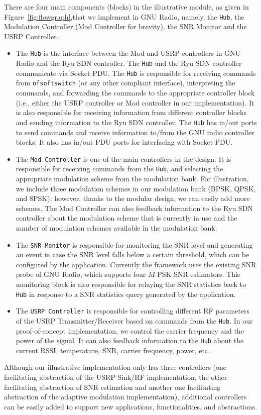 There are four main components (blocks) in the illustrative \crossflow module, as given in Figure~\ref{fig:flowgraph},that we implement in GNU Radio, namely, the \texttt{\crossflow Hub}, the Modulation Controller (Mod Controller for brevity), the SNR Monitor and the USRP Controller.
\begin{itemize}
\item The \texttt{\crossflow Hub} is the interface between the Mod and USRP controllers in GNU Radio and the Ryu SDN controller. The \texttt{\crossflow Hub} and the Ryu SDN controller communicate via Socket PDU. The \texttt{\crossflow Hub} is responsible for receiving commands from \texttt{ofsoftswitch} (or any other compliant interface), interpreting the commands, and forwarding the commands to the appropriate controller block (i.e., either the USRP controller or Mod controller in our implementation). It is also responsible for receiving information from different controller blocks and sending information to the Ryu SDN controller. The \texttt{\crossflow Hub} has in/out ports to send commands and receive information to/from the GNU radio controller blocks. It also has in/out PDU ports for interfacing with Socket PDU.
\item The \texttt{Mod Controller} is one of the main controllers in the design. It is responsible for receiving commands from the \texttt{\crossflow Hub}, and selecting the appropriate modulation scheme from the modulation bank. For illustration, we include three modulation schemes in our modulation bank (BPSK, QPSK, and 8PSK); however, thanks to the modular design, we can easily add more schemes. The Mod Controller can also feedback information to the Ryu SDN controller about the modulation scheme that is currently in use and the number of modulation schemes available in the modulation bank.
\item The \texttt{SNR Monitor} is responsible for monitoring the SNR level and generating an event in case the SNR level falls below a certain threshold, which can be configured by the application. Currently the framework uses the existing SNR probe of GNU Radio, which supports four $M$-PSK SNR estimators. This monitoring block is also responsible for relaying the SNR statistics back to \texttt{\crossflow Hub} in response to a SNR statistics query generated by the application.
\item The \texttt{USRP Controller} is responsible for controlling different RF parameters of the USRP Transmitter/Receiver based on commands from the \texttt{\crossflow Hub}. In our proof-of-concept implementation, we control the carrier frequency and the power of the signal. It can also feedback information to the \texttt{\crossflow Hub} about the current RSSI, temperature, SNR, carrier frequency, power, etc.
\end{itemize}
Although our illustrative implementation only has three controllers (one facilitating abstraction of the USRP Sink/RF implementation, the other facilitating abstraction of SNR estimation and another one facilitating abstraction of the adaptive modulation implementation), additional controllers can be easily added to support new applications, functionalities, and abstractions.

